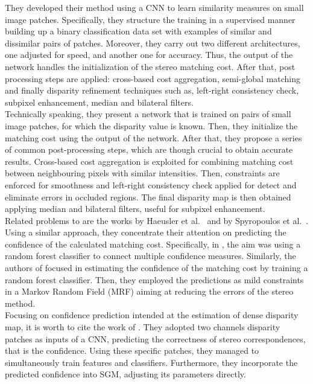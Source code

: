 They developed their method using a CNN to learn similarity measures on small image patches. 
Specifically, they structure the training in a supervised manner building up a binary classification data set with examples of similar and dissimilar pairs of patches. 
Moreover, they carry out two different architectures, one adjusted for speed, and another one for accuracy. 
Thus, the output of the network handles the initialization of the stereo matching cost. 
After that, post processing steps are applied: cross-based cost aggregation, semi-global matching and finally disparity refinement techniques such as, left-right consistency check, subpixel enhancement, median and bilateral filters.\\
Technically speaking, they present a network that is trained on pairs of small image patches, for which the disparity value is known. 
Then, they initialize the matching cost using the output of the network.
After that, they propose a series of common post-processing steps, which are though crucial to obtain accurate results.
Cross-based cost aggregation is exploited for combining matching cost between neighbouring pixels with similar intensities. 
Then, constraints are enforced for smoothness and left-right consistency check applied for detect and eliminate errors in occluded regions. 
The final disparity map is then obtained applying median and bilateral filters, useful for subpixel enhancement. \\
Related problems to \cite{Zbontar2016} are the works by Haeusler et al.~\cite{Haeusler2013} and by Spyropoulos et al.~\cite{Spyropoulos2014}. 
Using a similar approach, they concentrate their attention on predicting the confidence of the calculated matching cost. 
Specifically, in \cite{Haeusler2013}, the aim was using a random forest classifier to connect multiple confidence measures. 
Similarly, the authors of \cite{Spyropoulos2014} focused in estimating the confidence of the matching cost by training a random forest classifier. 
Then, they employed the predictions as mild constraints in a Markov Random Field (MRF) aiming at reducing the errors of the stereo method.\\
Focusing on confidence prediction intended at the estimation of dense disparity map, it is worth to cite the work of \cite{Seki2016}.
They adopted two channels disparity patches as inputs of a CNN, predicting the correctness of stereo correspondences, that is the confidence. 
Using these specific patches, they managed to simultaneously train features and classifiers.
Furthermore, they incorporate the predicted confidence into SGM, adjusting its parameters directly. \\
